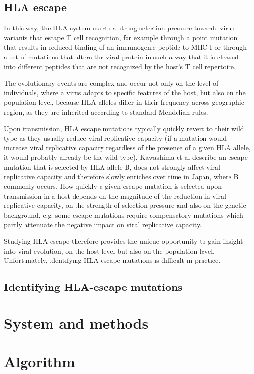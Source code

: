 \documentclass[fleqn,11pt]{SelfArx} %
\begin{document}
\subsection{HLA escape}
In this way, the HLA system exerts a strong selection pressure towards virus variants
that escape T cell recognition, for example through a point mutation
that results in reduced binding of an immunogenic peptide to MHC I or through a
set of mutations that alters the viral protein in such a way that it is cleaved into 
different peptides that are not recognized by the host's T cell repertoire.

The evolutionary events are complex and occur not only on the level of individuals, 
where a virus adapts to specific features of the host, but also on the population level,
because HLA alleles differ in their frequency across geographic region, as they are inherited
according to standard Mendelian rules.

Upon transmission, HLA escape mutations typically quickly revert to their wild type
as they usually reduce viral replicative capacity (if a mutation would increase
viral replicative capacity regardless of the presence of a given HLA allele, it would
probably already be the wild type). Kawashima et al
describe an escape mutation that is selected by HLA allele B,
does not strongly affect viral replicative capacity and therefore slowly enriches
over time in Japan, where B commonly occurs.
How quickly a given escape mutation is selected upon transmission in a host depends on the
magnitude of the reduction in viral replicative capacity, on the strength of selection
pressure and also on the genetic background, e.g. some escape mutations require compensatory 
mutations which partly attenuate the negative impact on viral replicative capacity.

Studying HLA escape therefore provides the unique opportunity to gain insight into
viral evolution, on the host level but also on the population level.
Unfortunately, identifying HLA escape mutations is difficult in practice.

\subsection{Identifying HLA-escape mutations}

\section{System and methods}
\section{Algorithm}
\end{document}
